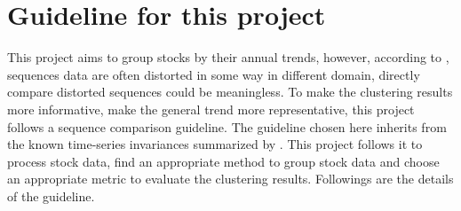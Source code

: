 \section{Guideline for this project}
\label{sec:invariance}
This project aims to group stocks by their annual trends, however, according to \cite{batista2014cid}, sequences data are often distorted in some way in different domain, directly compare distorted sequences could be meaningless. To make the clustering results more informative, make the general trend more representative, this project follows a sequence comparison guideline. The guideline chosen here inherits from the known time-series invariances summarized by \cite{paparrizos2015k}. This project follows it to process stock data, find an appropriate method to group stock data and choose an appropriate metric to evaluate the clustering results. Followings are the details of the guideline.
